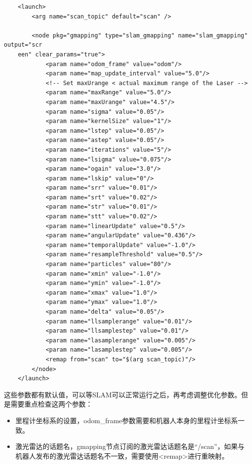 \documentclass[9pt, oneside]{book}
\begin{document}
\begin{verbatim}
    <launch>
        <arg name="scan_topic" default="scan" />

        <node pkg="gmapping" type="slam_gmapping" name="slam_gmapping" output="scr
    een" clear_params="true">
            <param name="odom_frame" value="odom"/>
            <param name="map_update_interval" value="5.0"/>
            <!-- Set maxUrange < actual maximum range of the Laser -->
            <param name="maxRange" value="5.0"/>
            <param name="maxUrange" value="4.5"/>
            <param name="sigma" value="0.05"/>
            <param name="kernelSize" value="1"/>
            <param name="lstep" value="0.05"/>
            <param name="astep" value="0.05"/>
            <param name="iterations" value="5"/>
            <param name="lsigma" value="0.075"/>
            <param name="ogain" value="3.0"/>
            <param name="lskip" value="0"/>
            <param name="srr" value="0.01"/>
            <param name="srt" value="0.02"/>
            <param name="str" value="0.01"/>
            <param name="stt" value="0.02"/>
            <param name="linearUpdate" value="0.5"/>
            <param name="angularUpdate" value="0.436"/>
            <param name="temporalUpdate" value="-1.0"/>
            <param name="resampleThreshold" value="0.5"/>
            <param name="particles" value="80"/>
            <param name="xmin" value="-1.0"/>
            <param name="ymin" value="-1.0"/>
            <param name="xmax" value="1.0"/>
            <param name="ymax" value="1.0"/>
            <param name="delta" value="0.05"/>
            <param name="llsamplerange" value="0.01"/>
            <param name="llsamplestep" value="0.01"/>
            <param name="lasamplerange" value="0.005"/>
            <param name="lasamplestep" value="0.005"/>
            <remap from="scan" to="$(arg scan_topic)"/>
        </node>
    </launch>
\end{verbatim}

这些参数都有默认值，可以等SLAM可以正常运行之后，再考虑调整优化参数。但是需要重点检查这两个参数：

\begin{itemize}
    \item 里程计坐标系的设置，odom\_frame参数需要和机器人本身的里程计坐标系一致。
    \item 激光雷达的话题名，gmapping节点订阅的激光雷达话题名是“/scan”，如果与机器人发布的激光雷达话题名不一致，需要使用<remap>进行重映射。
\end{itemize}
\end{document}
